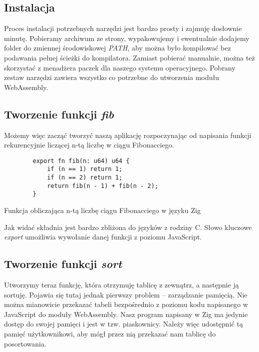 \documentclass[language=polish,type=master]{aghmodern}
\begin{document}
\subsection{Instalacja}
Proces instalacji potrzebnych narzędzi jest bardzo prosty i zajmuję dosłownie minutę.
Pobieramy archiwum ze strony, wypakowujemy i ewentualnie dodajemy folder do zmiennej środowiskowej \emph{PATH}, aby można było kompilować bez podawania pełnej ścieżki do kompilatora.
Zamiast pobierać manualnie, można też skorzystać z menadżera paczek dla naszego systemu operacyjnego.
Pobrany zestaw narzędzi zawiera wszystko co potrzebne do utworzenia modułu WebAssembly.

\subsection{Tworzenie funkcji \emph{fib}}
Możemy więc zacząć tworzyć naszą aplikację rozpoczynając od napisania funkcji rekurencyjnie liczącej n-tą liczbę w ciągu Fibonacciego.

\begin{listing}[H]
    \begin{verbatim}
        export fn fib(n: u64) u64 {
            if (n == 1) return 1;
            if (n == 2) return 1;
            return fib(n - 1) + fib(n - 2);
        }
    \end{verbatim}
    \caption{Funkcja obliczająca n-tą liczbę ciągu Fibonacciego w języku Zig}
\end{listing}

Jak widać składnia jest bardzo zbliżona do języków z rodziny C.
Słowo kluczowe \emph{export} umożliwia wywołanie danej funkcji z poziomu JavaScript.

\subsection{Tworzenie funkcji \emph{sort}}
Utworzymy teraz funkcję, która otrzymuję tablicę z zewnątrz, a następnie ją sortuję.
Pojawia się tutaj jednak pierwszy problem -- zarządzanie pamięcią.
Nie można mianowicie przekazać tabeli bezpośrednio z poziomu kodu napisanego w JavaScript do moduły WebAssembly.
Nasz program napisany w Zig ma jedynie dostęp do swojej pamięci i jest w tzw. piaskownicy\footnotemark{}.
Należy więc udostępnić tą pamięć użytkownikowi, aby mógł przez nią przekazać nam tablicę do posortowania.
\end{document}
